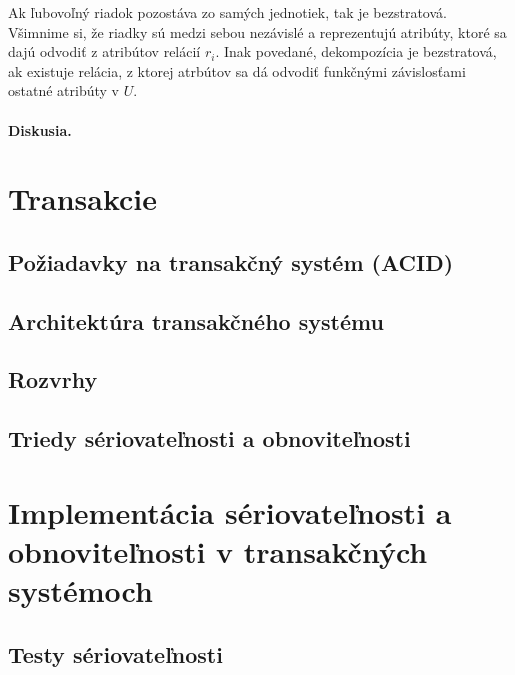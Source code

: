 \documentclass[10pt,a4paper]{article}
\begin{document}
Ak ľubovoľný riadok pozostáva zo samých jednotiek, tak je bezstratová. Všimnime si, že riadky sú medzi sebou nezávislé a reprezentujú atribúty, ktoré sa dajú odvodiť z atribútov relácií $r_i$. 
Inak povedané, dekompozícia je bezstratová, ak existuje relácia, z ktorej atrbútov sa dá odvodiť funkčnými závislosťami ostatné atribúty v $U$. 

\paragraph{Diskusia.}
    
\section{Transakcie} 
\subsection{Požiadavky na transakčný systém (ACID)}
\subsection{Architektúra transakčného systému}
\subsection{Rozvrhy}
\subsection{Triedy sériovateľnosti a obnoviteľnosti}
    
\section{Implementácia sériovateľnosti a obnoviteľnosti v transakčných systémoch} 
\subsection{Testy sériovateľnosti}
\end{document}
